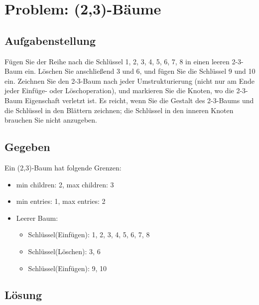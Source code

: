\section{Problem: (2,3)-Bäume}

\subsection{Aufgabenstellung}
Fügen Sie der Reihe nach die Schlüssel 1, 2, 3, 4, 5, 6, 7, 8 in einen leeren 2-3-Baum ein. Löschen Sie anschließend 3 und 6, und fügen Sie die Schlüssel 9 und 10 ein. Zeichnen Sie den 2-3-Baum nach jeder Umstrukturierung (nicht nur am Ende jeder
Einfüge- oder Löschoperation), und markieren Sie die Knoten, wo die 2-3-Baum Eigenschaft verletzt ist. Es reicht, wenn Sie die Gestalt des 2-3-Baums und die Schlüssel in den Blättern zeichnen; die Schlüssel in den inneren Knoten brauchen Sie nicht anzugeben.

\subsection{Gegeben}

Ein (2,3)-Baum hat folgende Grenzen:
\begin{itemize}
	\item min children: 2, max children: 3
	\item min entries: 1, max entries: 2
	\item Leerer Baum:
	\begin{itemize}
		\item Schlüssel(Einfügen): 1, 2, 3, 4, 5, 6, 7, 8
		\item Schlüssel(Löschen): 3, 6
		\item Schlüssel(Einfügen): 9, 10
	\end{itemize}
\end{itemize}

\subsection{Lösung}

